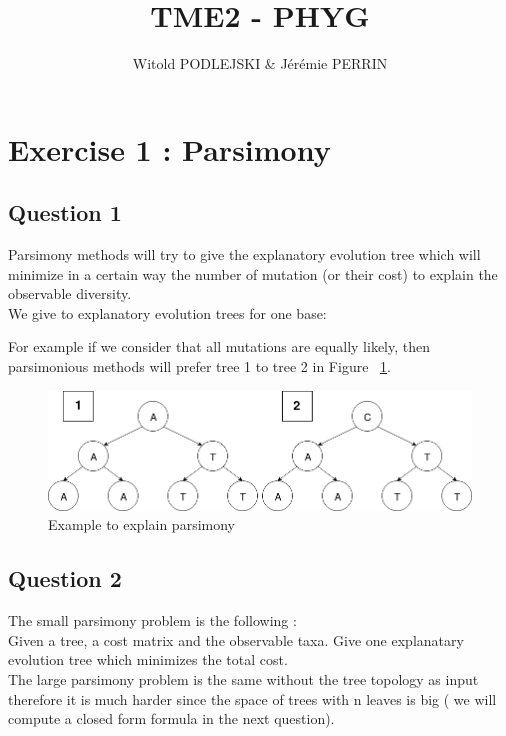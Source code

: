 \documentclass[]{article}
\title{TME2 - PHYG}
\author{Witold PODLEJSKI \& Jérémie PERRIN}
\theoremstyle{definition}
\begin{document}
\maketitle

\section{Exercise 1 : Parsimony}
\subsection{Question 1}
Parsimony methods will try to give the explanatory evolution tree which will minimize in a certain way the number of mutation (or their cost) to explain the observable diversity.\\
We give to explanatory evolution trees for one base:
	
For example if we consider that all mutations are equally likely, then parsimonious methods will prefer tree 1 to tree 2  in Figure ~\ref{fig:pars}.

 \begin{figure}[h!]
 	\centering
 	\includegraphics*[width = 0.8\linewidth]{image/parsimony.png}
 	\caption{\label{fig:pars} Example to explain parsimony}
 \end{figure}
 
\subsection{Question 2}
The small parsimony problem is the following :\\
Given a tree, a cost matrix and the observable taxa. Give one explanatary evolution tree which minimizes the total cost.\\
The large parsimony problem is the same without the tree topology as input therefore it is much harder since the space of trees with n leaves is big ( we will compute a closed form formula in the next question).
\end{document}
